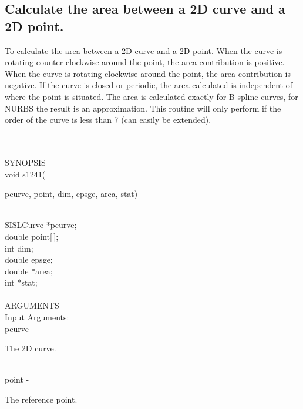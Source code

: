 \subsection{Calculate the area between a 2D curve and a 2D point.}
\begin{minipg1}
To calculate the area between a 2D curve and a 2D point.
               When the curve is rotating counter-clockwise around the
               point, the area contribution is positive.
               When the curve is rotating clockwise around the point,
               the area contribution is negative.
               If the curve is closed or periodic, the area calculated
               is independent of where the point is situated.
               The area is calculated exactly for B-spline curves, for
               NURBS the result is an approximation.
               This routine will only perform if the order of the curve is
               less than 7 (can easily be extended).
\end{minipg1} \\ \\
SYNOPSIS\\
        \> void s1241(\begin{minipg3}
            {\fov pcurve},  {\fov point},  {\fov dim},  {\fov epsge},  {\fov area},  {\fov stat})
                \end{minipg3}\\
                \>\>    SISLCurve    \>  *{\fov pcurve};\\
                \>\>    double    \>  {\fov point}[\,];\\
                \>\>    int    \>  {\fov dim};\\
                \>\>    double    \>  {\fov epsge};\\
                \>\>    double    \>  *{\fov area};\\
                \>\>    int    \>  *{\fov stat};\\
\\
ARGUMENTS\\
	\>Input Arguments:\\
        \>\>    {\fov pcurve}\> - \>  \begin{minipg2}
                     The 2D curve.
                               \end{minipg2}\\
        \>\>    {\fov point}\> - \>  \begin{minipg2}
                     The reference point.
                               \end{minipg2}\\
